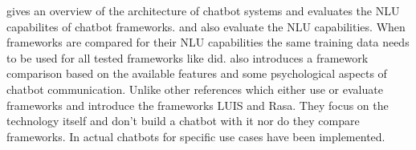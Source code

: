 \citet{braunEvaluatingNLU} gives an overview of the architecture of chatbot systems and 
evaluates the NLU capabilites of chatbot frameworks.
\citet{gregori2017evaluation} and \citet{dutta2017developing} also evaluate the NLU capabilities.
When frameworks are compared for their NLU capabilities the same training data needs to be used 
for all tested frameworks like \citet{braunEvaluatingNLU,gregori2017evaluation} did.
\citet{dutta2017developing} also introduces a framework comparison based on the available features
and some psychological aspects of chatbot communication.
Unlike other references which either use or evaluate frameworks \citet{luis2015williams} and \citet{rasabocklisch2017} 
introduce the frameworks LUIS\cite{luis2015williams} and Rasa\cite{rasabocklisch2017}. 
They focus on the technology itself and don't build a chatbot with it nor do they compare frameworks.
In \citet{dutta2017developing, pharmacybot, PRZEGALINSKA2019785} actual chatbots for specific use cases have been implemented.


